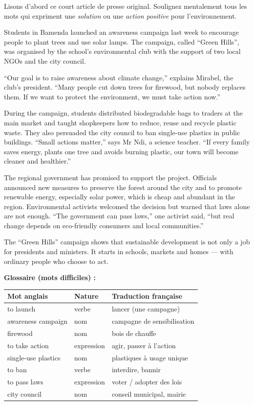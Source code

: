 \documentclass[11pt]{article}
\begin{document}
Lisons d'abord ce court article de presse original. Soulignez mentalement tous les mots qui expriment une \emph{solution} ou une \emph{action positive} pour l'environnement.

\begin{textebox}
Students in Bamenda launched an awareness campaign last week to encourage people to plant trees and use solar lamps. The campaign, called “Green Hills”, was organised by the school's environmental club with the support of two local NGOs and the city council.

“Our goal is to raise awareness about climate change,” explains Mirabel, the club's president. “Many people cut down trees for firewood, but nobody replaces them. If we want to protect the environment, we must take action now.”

During the campaign, students distributed biodegradable bags to traders at the main market and taught shopkeepers how to reduce, reuse and recycle plastic waste. They also persuaded the city council to ban single-use plastics in public buildings. “Small actions matter,” says Mr Ndi, a science teacher. “If every family saves energy, plants one tree and avoids burning plastic, our town will become cleaner and healthier.”

The regional government has promised to support the project. Officials announced new measures to preserve the forest around the city and to promote renewable energy, especially solar power, which is cheap and abundant in the region. Environmental activists welcomed the decision but warned that laws alone are not enough. “The government can pass laws,” one activist said, “but real change depends on eco-friendly consumers and local communities.”

The “Green Hills” campaign shows that sustainable development is not only a job for presidents and ministers. It starts in schools, markets and homes — with ordinary people who choose to act.
\end{textebox}

\textbf{Glossaire (mots difficiles) :}

\begin{center}
\begin{tabularx}{\linewidth}{|l|l|X|}
\hline
\rowcolor{popblueL} Mot anglais & Nature & Traduction française \\
\hline
to launch & verbe & lancer (une campagne) \\
\hline
awareness campaign & nom & campagne de sensibilisation \\
\hline
firewood & nom & bois de chauffe \\
\hline
to take action & expression & agir, passer à l'action \\
\hline
single-use plastics & nom & plastiques à usage unique \\
\hline
to ban & verbe & interdire, bannir \\
\hline
to pass laws & expression & voter / adopter des lois \\
\hline
city council & nom & conseil municipal, mairie \\
\hline
\end{tabularx}
\end{center}
\end{document}
